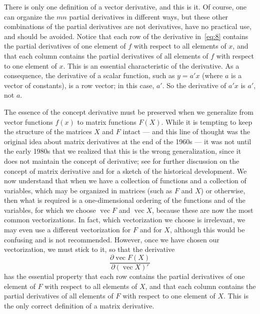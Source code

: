 \documentclass[12pt,a4paper]{article}
\theoremstyle{definition}
\DeclareMathOperator{\avec}{vec}
\begin{document}
There is only one definition of a vector derivative, and this is it. Of course, one can organize the $mn$ partial derivatives in different ways, but these other combinations of the partial derivatives are not derivatives, have no practical use, and should be avoided. %
Notice that each row of the derivative in~\eqref{eq:8} contains the partial derivatives of one element of $f$ with respect to all elements of $x$, and that each column contains the partial derivatives of all elements of $f$ with respect to one element of $x$. This is an essential characteristic of the derivative. As a consequence, the derivative of a scalar function, such as $y = a'x$ (where $a$ is a vector of constants), is a row vector; in this case, $a'$. So the derivative of $a'x$ is $a'$, not $a$. %

The essence of the concept derivative must be preserved when we generalize from vector functions $f(x)$ to matrix functions $F(X)$. While it is tempting to keep the structure of the matrices $X$ and $F$ intact --- and this line of thought was the original idea about matrix derivatives at the end of the 1960s --- it was not until the early 1980s that we realized that this is the wrong generalization, since it does not maintain the concept of derivative; see \cite{Magnus2010} for further discussion on the concept of matrix derivative and \cite{Magnus2024} for a sketch of the historical development. %
We now understand that when we have a collection of functions and a collection of variables, which may be organized in matrices (such as $F$ and $X$) or otherwise, then what is required is a one-dimensional ordering of the functions and of the variables, for which we choose $\avec F$ and $\avec X$, because these are now the most common vectorizations. In fact, which vectorization we choose is irrelevant, we may even use a different vectorization for $F$ and for $X$, although this would be confusing and is not recommended. %
However, once we have chosen our vectorization, we must stick to it, so that the derivative
\begin{equation}\label{eq:9}
\frac{\partial \avec F(X)}{\partial(\avec X)'}
\end{equation}
has the essential property that each row contains the partial derivatives of one element of $F$ with respect to all elements of $X$, and that each column contains the partial derivatives of all elements of $F$ with respect to one element of $X$. This is the only correct definition of a matrix derivative. %
\end{document}
